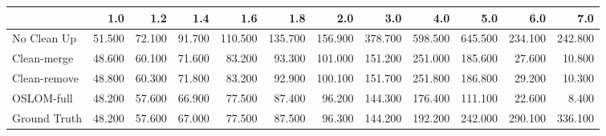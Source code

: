 \begin{tabular}{lrrrrrrrrrrr}
\toprule
{} &    1.0 &    1.2 &    1.4 &     1.6 &     1.8 &     2.0 &     3.0 &     4.0 &     5.0 &     6.0 &     7.0 \\
\midrule
No Clean Up  & 51.500 & 72.100 & 91.700 & 110.500 & 135.700 & 156.900 & 378.700 & 598.500 & 645.500 & 234.100 & 242.800 \\
Clean-merge  & 48.600 & 60.100 & 71.600 &  83.200 &  93.300 & 101.000 & 151.200 & 251.000 & 185.600 &  27.600 &  10.800 \\
Clean-remove & 48.800 & 60.300 & 71.800 &  83.200 &  92.900 & 100.100 & 151.700 & 251.800 & 186.800 &  29.200 &  10.300 \\
OSLOM-full   & 48.200 & 57.600 & 66.900 &  77.500 &  87.400 &  96.200 & 144.300 & 176.400 & 111.100 &  22.600 &   8.400 \\
Ground Truth & 48.200 & 57.600 & 67.000 &  77.500 &  87.500 &  96.300 & 144.200 & 192.200 & 242.000 & 290.100 & 336.100 \\
\bottomrule
\end{tabular}
